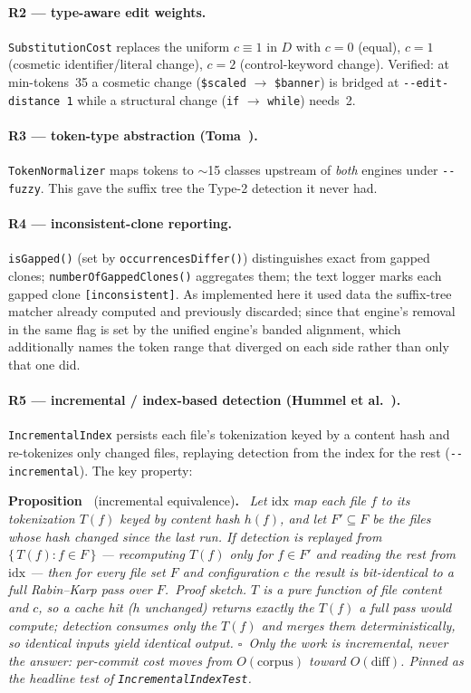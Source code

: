 \documentclass[10pt,a4paper]{article}
\newcounter{prop}[section]
\newcommand{\prop}[1]{\par\medskip\refstepcounter{prop}%
  \noindent\textbf{Proposition~\theprop} (#1)\textbf{.}\ \itshape}
\newcounter{lem}[section]
\begin{document}
\paragraph{R2 --- type-aware edit weights.} \lstinline!SubstitutionCost! replaces the uniform
$c\equiv 1$ in $D$ with $c=0$ (equal), $c=1$ (cosmetic identifier/literal change), $c=2$
(control-keyword change). Verified: at min-tokens~35 a cosmetic change (\lstinline!$scaled!
$\rightarrow$ \lstinline!$banner!) is bridged at \texttt{-{}-edit-distance 1} while a structural
change (\lstinline!if! $\rightarrow$ \lstinline!while!) needs~2.

\paragraph{R3 --- token-type abstraction (Toma~\cite{toma}).} \lstinline!TokenNormalizer! maps tokens
to $\sim$15 classes upstream of \emph{both} engines under \texttt{-{}-fuzzy}. This gave the suffix
tree the Type-2 detection it never had.

\paragraph{R4 --- inconsistent-clone reporting.} \lstinline!isGapped()! (set by
\lstinline!occurrencesDiffer()!) distinguishes exact from gapped clones; \lstinline!numberOfGappedClones()!
aggregates them; the text logger marks each gapped clone \texttt{[inconsistent]}. As implemented here
it used data the suffix-tree matcher already computed and previously discarded; since that engine's
removal in \factCodeRelease{} the same flag is set by the unified engine's banded alignment, which additionally
names the token range that diverged on each side rather than only that one did.

\paragraph{R5 --- incremental / index-based detection (Hummel et al.~\cite{hummel}).}
\lstinline!IncrementalIndex! persists each file's tokenization keyed by a content hash and
re-tokenizes only changed files, replaying detection from the index for the rest
(\texttt{-{}-incremental}). The key property:

\prop{incremental equivalence}
Let $\mathrm{idx}$ map each file $f$ to its tokenization $T(f)$ keyed by content hash $h(f)$, and let
$F'\subseteq F$ be the files whose hash changed since the last run. If detection is replayed from
$\{\,T(f): f\in F\,\}$ --- recomputing $T(f)$ only for $f\in F'$ and reading the rest from
$\mathrm{idx}$ --- then for every file set $F$ and configuration $c$ the result is bit-identical to a
full Rabin--Karp pass over $F$.\upshape\
\emph{Proof sketch.} $T$ is a pure function of file content and $c$, so a cache hit ($h$ unchanged)
returns exactly the $T(f)$ a full pass would compute; detection consumes only the $T(f)$ and merges
them deterministically, so identical inputs yield identical output. $\square$\ Only the \emph{work} is
incremental, never the \emph{answer}: per-commit cost moves from $O(\text{corpus})$ toward
$O(\text{diff})$. Pinned as the headline test of \lstinline!IncrementalIndexTest!.
\end{document}
